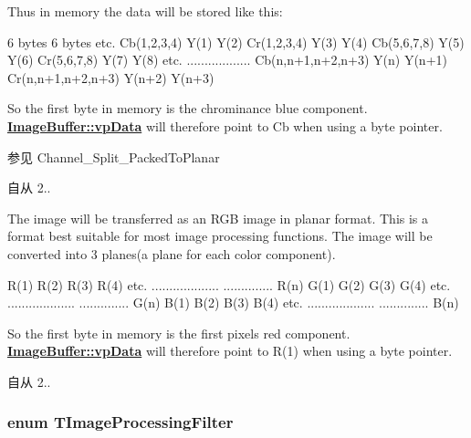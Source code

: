 \begin{Desc}
\begin{description}
Thus in memory the data will be stored like this\+:


\begin{DoxyCode}
6 bytes                                     6 bytes                                     etc.
Cb(1,2,3,4) Y(1) Y(2) Cr(1,2,3,4) Y(3) Y(4) Cb(5,6,7,8) Y(5) Y(6) Cr(5,6,7,8) Y(7) Y(8) etc.
..................                          Cb(n,n+1,n+2,n+3) Y(n) Y(n+1) Cr(n,n+1,n+2,n+3) Y(n+2) Y(n+3)
\end{DoxyCode}


So the first byte in memory is the chrominance blue component. {\bfseries \hyperlink{struct_image_buffer_ab67c9c21d749e786302c848b508e0673}{Image\+Buffer\+::vp\+Data}} will therefore point to Cb when using a byte pointer.

\begin{DoxySeeAlso}{参见}
Channel\+\_\+\+Split\+\_\+\+Packed\+To\+Planar
\end{DoxySeeAlso}
\begin{DoxySince}{自从}
2.. 
\end{DoxySince}
\item[{\em 
\hypertarget{group___common_interface_gga02e0fc32ff10e0bc0f2e8b9c321d65c9a26ab3e7130ffc2913745b75965843c20}{idpf\+R\+G\+B888\+Planar}\label{group___common_interface_gga02e0fc32ff10e0bc0f2e8b9c321d65c9a26ab3e7130ffc2913745b75965843c20}
}]The image will be transferred as an R\+G\+B image in planar format. This is a format best suitable for most image processing functions. The image will be converted into 3 planes(a plane for each color component).


\begin{DoxyCode}
R(1) R(2) R(3) R(4) etc.
...................
.............. R(n)
G(1) G(2) G(3) G(4) etc.
...................
.............. G(n)
B(1) B(2) B(3) B(4) etc.
...................
.............. B(n)
\end{DoxyCode}


So the first byte in memory is the first pixels red component. {\bfseries \hyperlink{struct_image_buffer_ab67c9c21d749e786302c848b508e0673}{Image\+Buffer\+::vp\+Data}} will therefore point to R(1) when using a byte pointer.

\begin{DoxySince}{自从}
2.. 
\end{DoxySince}
\end{description}
\end{Desc}
\hypertarget{group___common_interface_ga78ae15c334c800044e1b7042975fc829}{
\subsubsection[{T\+Image\+Processing\+Filter}]{\setlength{\rightskip}{0pt plus 5cm}enum {\bf T\+Image\+Processing\+Filter}}}\label{group___common_interface_ga78ae15c334c800044e1b7042975fc829}


